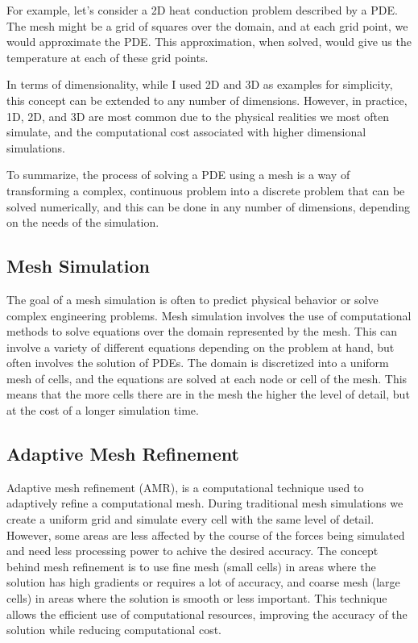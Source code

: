 \documentclass[12pt, a4paper]{scrartcl}
\begin{document}
For example, let's consider a 2D heat conduction problem described by a PDE. The mesh might 
be a grid of squares over the domain, and at each grid point, we would approximate the PDE. 
This approximation, when solved, would give us the temperature at each of these grid points.

In terms of dimensionality, while I used 2D and 3D as examples for simplicity, this concept 
can be extended to any number of dimensions. However, in practice, 1D, 2D, and 3D are most 
common due to the physical realities we most often simulate, and the computational cost 
associated with higher dimensional simulations.

To summarize, the process of solving a PDE using a mesh is a way of transforming a 
complex, continuous problem into a discrete problem that can be solved numerically, and 
this can be done in any number of dimensions, depending on the needs of the simulation.

\subsection{Mesh Simulation}

The goal of a mesh simulation is often to predict 
physical behavior or solve complex engineering problems.
Mesh simulation involves the use of computational methods to 
solve equations over the domain represented by the mesh. This can involve a variety of 
different equations depending on the problem at hand, but often involves the solution 
of PDEs. The domain is discretized into a uniform mesh of cells, and the equations are 
solved at each node or cell of the mesh. This means that the more cells there
are in the mesh the higher the level of detail, but at the cost of a longer simulation time.


\subsection{Adaptive Mesh Refinement}

Adaptive mesh refinement (AMR), is 
a computational technique used to adaptively refine a computational mesh. During traditional mesh 
simulations we create a uniform grid and simulate every cell with the same level of detail. However, 
some areas are less affected by the course of the forces being simulated
and need less processing power to achive the desired accuracy. The concept 
behind mesh refinement is to use fine mesh (small cells) in areas where the solution has 
high gradients or requires a lot of accuracy, and coarse mesh (large cells) in areas where 
the solution is smooth or less important. This technique allows the efficient use of 
computational resources, improving the accuracy of the solution while reducing 
computational cost.
\end{document}
